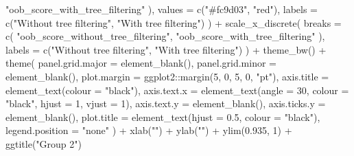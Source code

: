 \documentclass[
  11pt,
  oneside]{book}
\newenvironment{Shaded}{\begin{snugshade}}{\end{snugshade}}
\newcommand{\AttributeTok}[1]{\textcolor[rgb]{0.77,0.63,0.00}{#1}}
\newcommand{\DecValTok}[1]{\textcolor[rgb]{0.00,0.00,0.81}{#1}}
\newcommand{\FloatTok}[1]{\textcolor[rgb]{0.00,0.00,0.81}{#1}}
\newcommand{\FunctionTok}[1]{\textcolor[rgb]{0.00,0.00,0.00}{#1}}
\newcommand{\NormalTok}[1]{#1}
\newcommand{\SpecialCharTok}[1]{\textcolor[rgb]{0.00,0.00,0.00}{#1}}
\newcommand{\StringTok}[1]{\textcolor[rgb]{0.31,0.60,0.02}{#1}}
\begin{document}
\begin{Shaded}
\begin{Highlighting}[]
      \StringTok{"oob\_score\_with\_tree\_filtering"}
\NormalTok{    ),}
    \AttributeTok{values =} \FunctionTok{c}\NormalTok{(}\StringTok{"\#fc9d03"}\NormalTok{, }\StringTok{"red"}\NormalTok{),}
    \AttributeTok{labels =} \FunctionTok{c}\NormalTok{(}\StringTok{"Without tree filtering"}\NormalTok{, }\StringTok{"With tree filtering"}\NormalTok{)}
\NormalTok{  ) }\SpecialCharTok{+}
  \FunctionTok{scale\_x\_discrete}\NormalTok{(}
    \AttributeTok{breaks =} \FunctionTok{c}\NormalTok{(}
      \StringTok{"oob\_score\_without\_tree\_filtering"}\NormalTok{,}
      \StringTok{"oob\_score\_with\_tree\_filtering"}
\NormalTok{    ),}
    \AttributeTok{labels =} \FunctionTok{c}\NormalTok{(}\StringTok{"Without tree filtering"}\NormalTok{, }\StringTok{"With tree filtering"}\NormalTok{)}
\NormalTok{  ) }\SpecialCharTok{+}
  \FunctionTok{theme\_bw}\NormalTok{() }\SpecialCharTok{+}
  \FunctionTok{theme}\NormalTok{(}
    \AttributeTok{panel.grid.major =} \FunctionTok{element\_blank}\NormalTok{(),}
    \AttributeTok{panel.grid.minor =} \FunctionTok{element\_blank}\NormalTok{(),}
    \AttributeTok{plot.margin =}\NormalTok{ ggplot2}\SpecialCharTok{::}\FunctionTok{margin}\NormalTok{(}\DecValTok{5}\NormalTok{, }\DecValTok{0}\NormalTok{, }\DecValTok{5}\NormalTok{, }\DecValTok{0}\NormalTok{, }\StringTok{"pt"}\NormalTok{),}
    \AttributeTok{axis.title =} \FunctionTok{element\_text}\NormalTok{(}\AttributeTok{colour =} \StringTok{"black"}\NormalTok{),}
    \AttributeTok{axis.text.x =} \FunctionTok{element\_text}\NormalTok{(}\AttributeTok{angle =} \DecValTok{30}\NormalTok{, }\AttributeTok{colour =} \StringTok{"black"}\NormalTok{, }\AttributeTok{hjust =} \DecValTok{1}\NormalTok{, }\AttributeTok{vjust =} \DecValTok{1}\NormalTok{),}
    \AttributeTok{axis.text.y =} \FunctionTok{element\_blank}\NormalTok{(),}
    \AttributeTok{axis.ticks.y =} \FunctionTok{element\_blank}\NormalTok{(),}
    \AttributeTok{plot.title =} \FunctionTok{element\_text}\NormalTok{(}\AttributeTok{hjust =} \FloatTok{0.5}\NormalTok{, }\AttributeTok{colour =} \StringTok{"black"}\NormalTok{),}
    \AttributeTok{legend.position =} \StringTok{"none"}
\NormalTok{  ) }\SpecialCharTok{+}
  \FunctionTok{xlab}\NormalTok{(}\StringTok{""}\NormalTok{) }\SpecialCharTok{+}
  \FunctionTok{ylab}\NormalTok{(}\StringTok{""}\NormalTok{) }\SpecialCharTok{+}
  \FunctionTok{ylim}\NormalTok{(}\FloatTok{0.935}\NormalTok{, }\DecValTok{1}\NormalTok{) }\SpecialCharTok{+}
  \FunctionTok{ggtitle}\NormalTok{(}\StringTok{"Group 2"}\NormalTok{)}


\end{Highlighting}
\end{Shaded}
\end{document}
